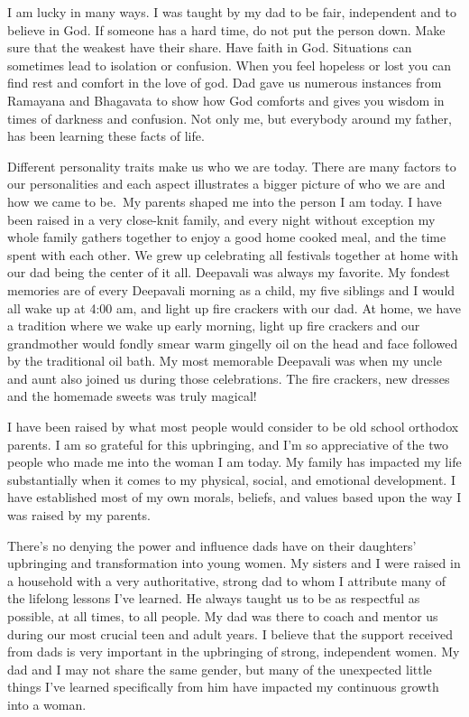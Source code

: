 I am lucky in many ways. I was taught by my dad to be fair, independent and to believe in God. If someone has a hard time, do not put the person down. Make sure that the weakest have their share. Have faith in God. Situations can sometimes lead to isolation or confusion. When you feel hopeless or lost you can find rest and comfort in the love of god. Dad gave us numerous instances from Ramayana and Bhagavata to show how God comforts and gives you wisdom in times of darkness and confusion. Not only me, but everybody around my father, has been learning these facts of life.
\medskip

Different personality traits make us who we are today. There are many factors to our personalities and each aspect illustrates a bigger picture of who we are and how we came to be. My parents shaped me into the person I am today. I have been raised in a very close-knit family, and every night without exception my whole family gathers together to enjoy a good home cooked meal, and the time spent with each other. We grew up celebrating all festivals together at home with our dad being the center of it all. Deepavali was always my favorite. My fondest memories are of every Deepavali morning as a child, my five siblings and I would all wake up at 4:00 am, and light up fire crackers with our dad. At home, we have a tradition where we wake up early morning, light up fire crackers and our grandmother would fondly smear warm gingelly oil on the head and face followed by the traditional oil bath. My most memorable Deepavali was when my uncle and aunt also joined us during those celebrations. The fire crackers, new dresses and the homemade sweets was truly magical! 
\medskip

I have been raised by what most people would consider to be old school orthodox parents. I am so grateful for this upbringing, and I'm so appreciative of the two people who made me into the woman I am today. My family has impacted my life substantially when it comes to my physical, social, and emotional development. I have established most of my own morals, beliefs, and values based upon the way I was raised by my parents.
\medskip

There’s no denying the power and influence dads have on their daughters’ upbringing and transformation into young women. My sisters and I were raised in a household with a very authoritative, strong dad to whom I attribute many of the lifelong lessons I’ve learned. He always taught us to be as respectful as possible, at all times, to all people. My dad was there to coach and mentor us during our most crucial teen and adult years. I believe that the support received from dads is very important in the upbringing of strong, independent women. My dad and I may not share the same gender, but many of the unexpected little things I've learned specifically from him have impacted my continuous growth into a woman.
\medskip

